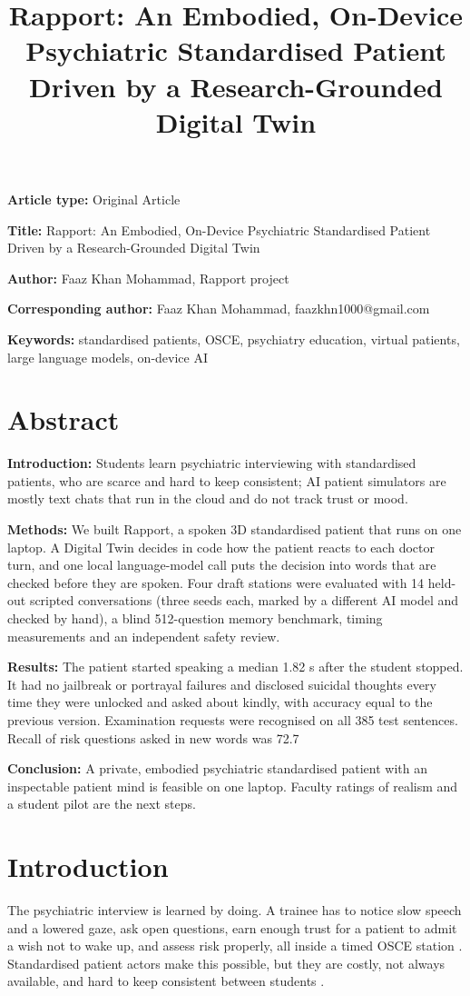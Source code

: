 \documentclass{article}
\title{Rapport: An Embodied, On-Device Psychiatric Standardised Patient Driven by a Research-Grounded Digital Twin}
\begin{document}
\maketitle
\textbf{Article type:} Original Article

\textbf{Title:} Rapport: An Embodied, On-Device Psychiatric Standardised Patient Driven by a Research-Grounded Digital Twin

\textbf{Author:} Faaz Khan Mohammad, Rapport project

\textbf{Corresponding author:} Faaz Khan Mohammad, faazkhn1000@gmail.com

\textbf{Keywords:} standardised patients, OSCE, psychiatry education, virtual patients, large language models, on-device AI

\section*{Abstract}
\textbf{Introduction:} Students learn psychiatric interviewing with standardised patients, who are scarce and hard to keep consistent; AI patient simulators are mostly text chats that run in the cloud and do not track trust or mood.

\textbf{Methods:} We built Rapport, a spoken 3D standardised patient that runs on one laptop. A Digital Twin decides in code how the patient reacts to each doctor turn, and one local language-model call puts the decision into words that are checked before they are spoken. Four draft stations were evaluated with 14 held-out scripted conversations (three seeds each, marked by a different AI model and checked by hand), a blind 512-question memory benchmark, timing measurements and an independent safety review.

\textbf{Results:} The patient started speaking a median 1.82 s after the student stopped. It had no jailbreak or portrayal failures and disclosed suicidal thoughts every time they were unlocked and asked about kindly, with accuracy equal to the previous version. Examination requests were recognised on all 385 test sentences. Recall of risk questions asked in new words was 72.7%

\textbf{Conclusion:} A private, embodied psychiatric standardised patient with an inspectable patient mind is feasible on one laptop. Faculty ratings of realism and a student pilot are the next steps.

\section{Introduction}
The psychiatric interview is learned by doing. A trainee has to notice slow speech and a lowered gaze, ask open questions, earn enough trust for a
patient to admit a wish not to wake up, and assess risk properly, all inside a timed OSCE station \cite{harden1975osce}. Standardised patient actors
make this possible, but they are costly, not always available, and hard to keep consistent between students \cite{piot2021simulation}.
\end{document}

